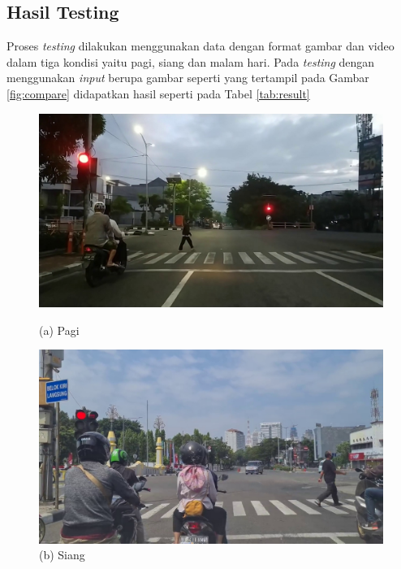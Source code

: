 \documentclass[conference]{IEEEtran}
\begin{document}
	\subsection{Hasil Testing}
	\vspace{1ex}
	Proses \textit{testing} dilakukan menggunakan data dengan format gambar dan video dalam tiga kondisi yaitu pagi, siang dan malam hari. Pada \textit{testing} dengan menggunakan \textit{input} berupa gambar seperti yang tertampil pada Gambar \ref{fig:compare} didapatkan hasil seperti pada Tabel \ref{tab:result}
	\vspace{1ex}
	\begin{figure}[h]
		\centering
		\begin{minipage}[b]{0.2\textwidth}
			\includegraphics[width=\textwidth]{img/frame800.jpg}
			\caption*{(a) Pagi}
		\end{minipage}
		\hfill
		\begin{minipage}[b]{0.2\textwidth}
			\includegraphics[width=\textwidth]{img/frame475.jpg}
			\caption*{(b) Siang}
		\end{minipage}
		\hfill
		\begin{minipage}[b]{0.2\textwidth}

\end{minipage}
\end{figure}
\end{document}
